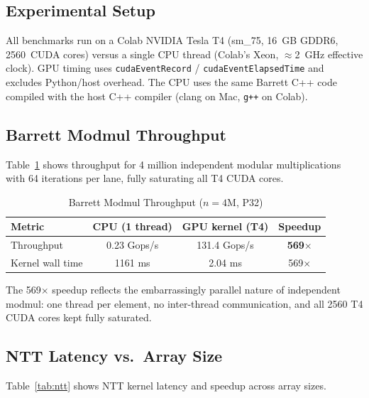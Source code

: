 \documentclass[conference]{IEEEtran}
\begin{document}
\subsection{Experimental Setup}

All benchmarks run on a Colab NVIDIA Tesla T4 (sm\_75, 16~GB GDDR6,
2560~CUDA cores) versus a single CPU thread (Colab's Xeon, $\approx$2~GHz
effective clock). GPU timing uses \texttt{cudaEventRecord} /
\texttt{cudaEventElapsedTime} and excludes Python/host overhead. The CPU uses
the same Barrett C++ code compiled with the host C++ compiler (clang on Mac, \texttt{g++} on Colab).

\subsection{Barrett Modmul Throughput}

Table~\ref{tab:modmul} shows throughput for 4 million independent modular
multiplications with 64 iterations per lane, fully saturating all T4 CUDA
cores.

\begin{table}[t]
\caption{Barrett Modmul Throughput ($n=4$M, P32)}
\label{tab:modmul}
\begin{center}
\begin{tabular}{|l|c|c|c|}
\hline
\textbf{Metric} & \textbf{CPU (1 thread)} & \textbf{GPU kernel (T4)} & \textbf{Speedup} \\
\hline
Throughput & 0.23 Gops/s & 131.4 Gops/s & \textbf{569$\times$} \\
Kernel wall time & 1161 ms & 2.04 ms & 569$\times$ \\
\hline
\end{tabular}
\end{center}
\end{table}

The 569$\times$ speedup reflects the embarrassingly parallel nature of
independent modmul: one thread per element, no inter-thread communication, and
all 2560 T4 CUDA cores kept fully saturated.

\subsection{NTT Latency vs.\ Array Size}

Table~\ref{tab:ntt} shows NTT kernel latency and speedup across array sizes.
\end{document}
